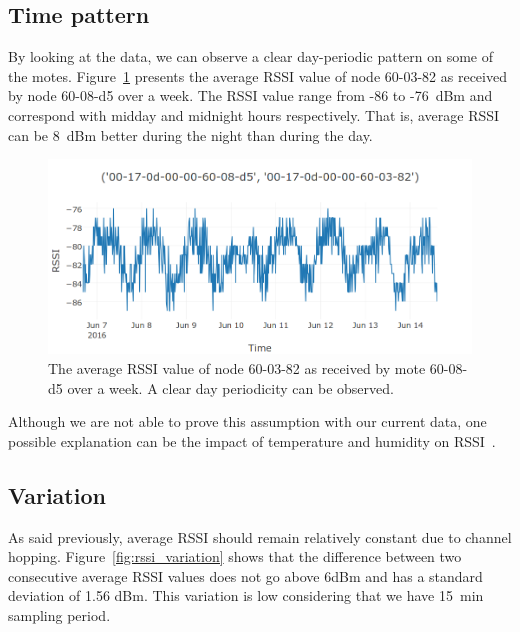 \documentclass{sig-alternate}
\begin{document}
\subsection{Time pattern}

By looking at the data, we can observe a clear day-periodic pattern on some of the motes.
Figure~\ref{fig:periodic_rssi} presents the average RSSI value of node 60-03-82 as received by node 60-08-d5 over a week.
The RSSI value range from -86 to -76~dBm and correspond with midday and midnight hours respectively.
That is, average RSSI can be 8~dBm better during the night than during the day.

\begin{figure}
    \centering
    \includegraphics[width=\columnwidth]{periodic_rssi}
    \caption{The average RSSI value of node 60-03-82 as received by mote 60-08-d5 over a week. A clear day periodicity can be observed.}
    \label{fig:periodic_rssi}
\end{figure}

Although we are not able to prove this assumption with our current data, one possible explanation can be the impact of temperature and humidity on RSSI~\cite{luomala15effects}.

\subsection{Variation}

As said previously, average RSSI should remain relatively constant due to channel hopping.
Figure~\ref{fig:rssi_variation} shows that the difference between two consecutive average RSSI values does not go above 6dBm and has a standard deviation of 1.56 dBm.
This variation is low considering that we have 15~min sampling period.
\end{document}
